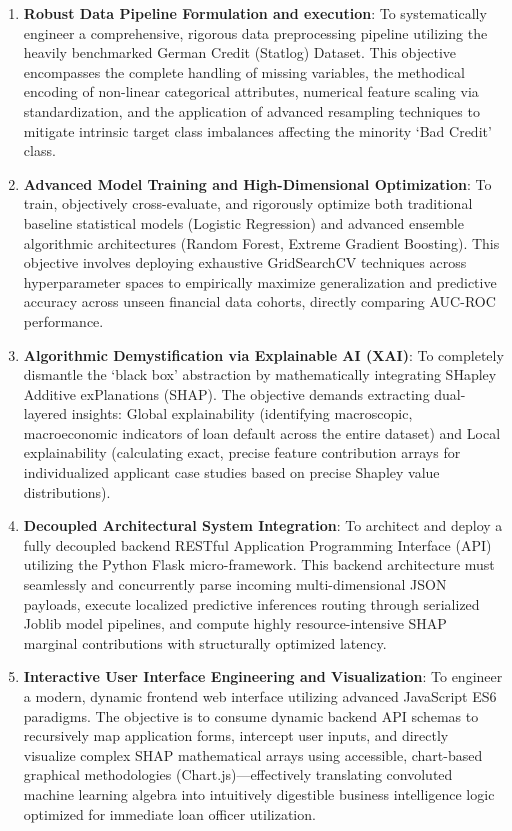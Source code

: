 \begin{enumerate}
\def\labelenumi{\arabic{enumi}.}
\item
  \textbf{Robust Data Pipeline Formulation and execution}: To
  systematically engineer a comprehensive, rigorous data preprocessing
  pipeline utilizing the heavily benchmarked German Credit (Statlog)
  Dataset. This objective encompasses the complete handling of missing
  variables, the methodical encoding of non-linear categorical
  attributes, numerical feature scaling via standardization, and the
  application of advanced resampling techniques to mitigate intrinsic
  target class imbalances affecting the minority `Bad Credit' class.
\item
  \textbf{Advanced Model Training and High-Dimensional Optimization}: To
  train, objectively cross-evaluate, and rigorously optimize both
  traditional baseline statistical models (Logistic Regression) and
  advanced ensemble algorithmic architectures (Random Forest, Extreme
  Gradient Boosting). This objective involves deploying exhaustive
  GridSearchCV techniques across hyperparameter spaces to empirically
  maximize generalization and predictive accuracy across unseen
  financial data cohorts, directly comparing AUC-ROC performance.
\item
  \textbf{Algorithmic Demystification via Explainable AI (XAI)}: To
  completely dismantle the `black box' abstraction by mathematically
  integrating SHapley Additive exPlanations (SHAP). The objective
  demands extracting dual-layered insights: Global explainability
  (identifying macroscopic, macroeconomic indicators of loan default
  across the entire dataset) and Local explainability (calculating
  exact, precise feature contribution arrays for individualized
  applicant case studies based on precise Shapley value distributions).
\item
  \textbf{Decoupled Architectural System Integration}: To architect and
  deploy a fully decoupled backend RESTful Application Programming
  Interface (API) utilizing the Python Flask micro-framework. This
  backend architecture must seamlessly and concurrently parse incoming
  multi-dimensional JSON payloads, execute localized predictive
  inferences routing through serialized Joblib model pipelines, and
  compute highly resource-intensive SHAP marginal contributions with
  structurally optimized latency.
\item
  \textbf{Interactive User Interface Engineering and Visualization}: To
  engineer a modern, dynamic frontend web interface utilizing advanced
  JavaScript ES6 paradigms. The objective is to consume dynamic backend
  API schemas to recursively map application forms, intercept user
  inputs, and directly visualize complex SHAP mathematical arrays using
  accessible, chart-based graphical methodologies
  (Chart.js)---effectively translating convoluted machine learning
  algebra into intuitively digestible business intelligence logic
  optimized for immediate loan officer utilization.
\end{enumerate}

